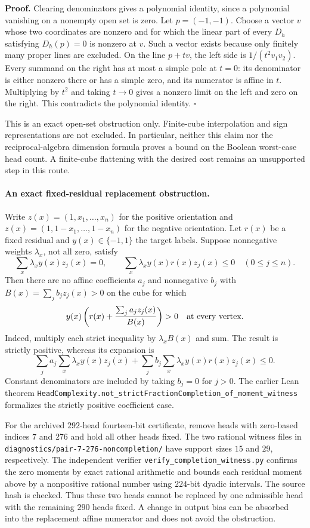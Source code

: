 \documentclass[11pt]{article}
\begin{document}
\textbf{Proof.} Clearing denominators gives a polynomial identity,
since a polynomial vanishing on a nonempty open set is zero.
Let $p=(-1,-1)$. Choose a vector $v$ whose two coordinates are
nonzero and for which the linear part of every $D_h$ satisfying
$D_h(p)=0$ is nonzero at $v$. Such a vector exists because only
finitely many proper lines are excluded. On the line $p+tv$, the
left side is $1/(t^2v_1v_2)$. Every summand on the right has at most
a simple pole at $t=0$: its denominator is either nonzero there or
has a simple zero, and its numerator is affine in $t$.
Multiplying by $t^2$ and taking $t\to0$ gives a nonzero limit on the
left and zero on the right. This contradicts the polynomial identity.
$\square$

This is an exact open-set obstruction only. Finite-cube interpolation
and sign representations are not excluded. In particular, neither
this claim nor the reciprocal-algebra dimension formula proves a
bound on the Boolean worst-case head count. A finite-cube flattening
with the desired cost remains an unsupported step in this route.


\paragraph{An exact fixed-residual replacement obstruction.}
Write $z(x)=(1,x_1,\ldots,x_n)$ for the positive orientation and
$z(x)=(1,1-x_1,\ldots,1-x_n)$ for the negative orientation.
Let $r(x)$ be a fixed residual and $y(x)\in\{-1,1\}$ the target labels.
Suppose nonnegative weights $\lambda_x$, not all zero, satisfy
\[
 \sum_x\lambda_xy(x)z_j(x)=0,\qquad
 \sum_x\lambda_xy(x)r(x)z_j(x)\le0
 \quad(0\le j\le n).
\]
Then there are no affine coefficients $a_j$ and nonnegative $b_j$
with $B(x)=\sum_jb_jz_j(x)>0$ on the cube for which
\[
 y(x)\left(r(x)+\frac{\sum_ja_jz_j(x)}{B(x)}\right)>0
 \quad\hbox{at every vertex.}
\]
Indeed, multiply each strict inequality by $\lambda_xB(x)$ and sum.
The result is strictly positive, whereas its expansion is
\[
 \sum_j a_j\sum_x\lambda_xy(x)z_j(x)
 +\sum_j b_j\sum_x\lambda_xy(x)r(x)z_j(x)\le0.
\]
Constant denominators are included by taking $b_j=0$ for $j>0$.
The earlier Lean theorem
\texttt{HeadComplexity.not\_strictFractionCompletion\_of\_moment\_witness}
formalizes the strictly positive coefficient case.

For the archived $292$-head fourteen-bit certificate, remove heads
with zero-based indices $7$ and $276$ and hold all other heads fixed.
The two rational witness files in
\texttt{diagnostics/pair-7-276-noncompletion/} have support sizes
$15$ and $29$, respectively. The independent verifier
\texttt{verify\_completion\_witness.py} confirms the zero moments by
exact rational arithmetic and bounds each residual moment above by
a nonpositive rational number using $224$-bit dyadic intervals.
The source hash is checked. Thus these two heads cannot be replaced
by one admissible head with the remaining $290$ heads fixed.
A change in output bias can be absorbed into the replacement affine
numerator and does not avoid the obstruction.
\end{document}
